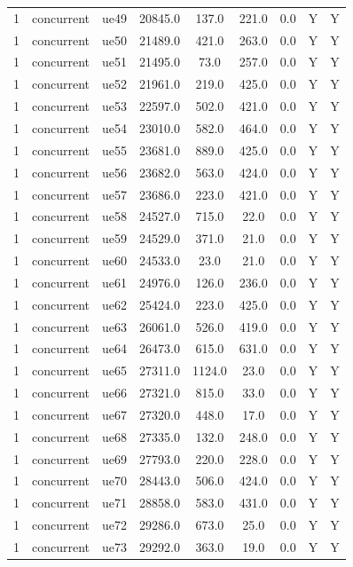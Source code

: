 \begin{table}[ht]
\begin{tabular}{|c|c|c|c|c|c|c|c|c|}
1 & concurrent & ue49 & 20845.0 & 137.0 & 221.0 & 0.0 & Y & Y \\
1 & concurrent & ue50 & 21489.0 & 421.0 & 263.0 & 0.0 & Y & Y \\
1 & concurrent & ue51 & 21495.0 & 73.0 & 257.0 & 0.0 & Y & Y \\
1 & concurrent & ue52 & 21961.0 & 219.0 & 425.0 & 0.0 & Y & Y \\
1 & concurrent & ue53 & 22597.0 & 502.0 & 421.0 & 0.0 & Y & Y \\
1 & concurrent & ue54 & 23010.0 & 582.0 & 464.0 & 0.0 & Y & Y \\
1 & concurrent & ue55 & 23681.0 & 889.0 & 425.0 & 0.0 & Y & Y \\
1 & concurrent & ue56 & 23682.0 & 563.0 & 424.0 & 0.0 & Y & Y \\
1 & concurrent & ue57 & 23686.0 & 223.0 & 421.0 & 0.0 & Y & Y \\
1 & concurrent & ue58 & 24527.0 & 715.0 & 22.0 & 0.0 & Y & Y \\
1 & concurrent & ue59 & 24529.0 & 371.0 & 21.0 & 0.0 & Y & Y \\
1 & concurrent & ue60 & 24533.0 & 23.0 & 21.0 & 0.0 & Y & Y \\
1 & concurrent & ue61 & 24976.0 & 126.0 & 236.0 & 0.0 & Y & Y \\
1 & concurrent & ue62 & 25424.0 & 223.0 & 425.0 & 0.0 & Y & Y \\
1 & concurrent & ue63 & 26061.0 & 526.0 & 419.0 & 0.0 & Y & Y \\
1 & concurrent & ue64 & 26473.0 & 615.0 & 631.0 & 0.0 & Y & Y \\
1 & concurrent & ue65 & 27311.0 & 1124.0 & 23.0 & 0.0 & Y & Y \\
1 & concurrent & ue66 & 27321.0 & 815.0 & 33.0 & 0.0 & Y & Y \\
1 & concurrent & ue67 & 27320.0 & 448.0 & 17.0 & 0.0 & Y & Y \\
1 & concurrent & ue68 & 27335.0 & 132.0 & 248.0 & 0.0 & Y & Y \\
1 & concurrent & ue69 & 27793.0 & 220.0 & 228.0 & 0.0 & Y & Y \\
1 & concurrent & ue70 & 28443.0 & 506.0 & 424.0 & 0.0 & Y & Y \\
1 & concurrent & ue71 & 28858.0 & 583.0 & 431.0 & 0.0 & Y & Y \\
1 & concurrent & ue72 & 29286.0 & 673.0 & 25.0 & 0.0 & Y & Y \\
1 & concurrent & ue73 & 29292.0 & 363.0 & 19.0 & 0.0 & Y & Y \\

\end{tabular}
\end{table}
